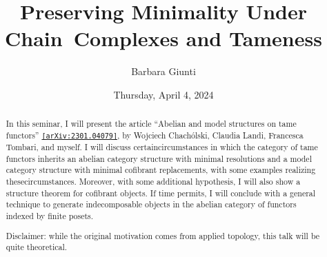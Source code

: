 \documentclass{UAmathtalk}
\author{Barbara Giunti}
\title{Preserving Minimality Under Chain~Complexes and Tameness}
\date{Thursday, April 4, 2024}
\begin{document}
\maketitle

\begin{abstract}
In this seminar, I will present the article “Abelian and model structures on tame functors” \href{https://arxiv.org/abs/2301.04079/}{\texttt{[arXiv:2301.04079]}}, by Wojciech \mbox{Chachólski}, Claudia Landi, Francesca Tombari, and myself. I will discuss certain\linebreak circumstances in which the category of tame functors inherits an abelian category structure with minimal resolutions and a model category structure with minimal cofibrant replacements, with some examples realizing these\linebreak circumstances. Moreover, with some additional hypothesis,  I will also show a structure theorem for cofibrant objects. If time permits, I will conclude with a general technique to generate indecomposable objects in the abelian category of functors indexed by finite posets.

Disclaimer: while the original motivation comes from applied topology, this talk will be quite theoretical.
\end{abstract}
\end{document}
